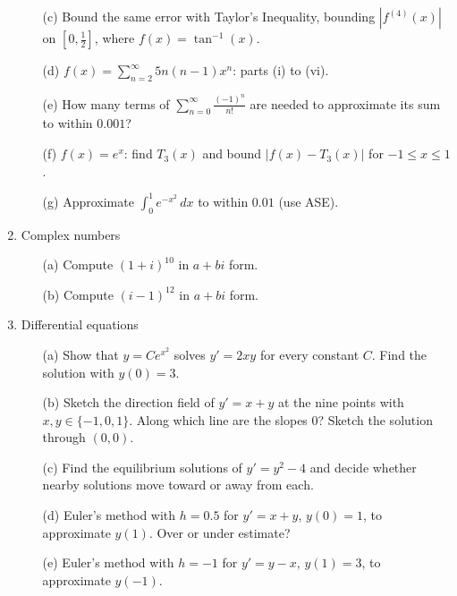 \documentclass[12pt]{article}
\begin{document}
\begin{enumerate}
\begin{enumerate}
\item[(c)] Bound the same error with Taylor's Inequality, bounding $|f^{(4)}(x)|$ on $[0,\frac12]$, where $f(x)=\tan^{-1}(x)$.

\item[(d)] $f(x)=\sum_{n=2}^\infty5n(n-1)x^n$: parts (i) to (vi).

\item[(e)] How many terms of $\sum_{n=0}^\infty\frac{(-1)^n}{n!}$ are needed to approximate its sum to within $0.001$?

\item[(f)] $f(x)=e^x$: find $T_3(x)$ and bound $|f(x)-T_3(x)|$ for $-1\le x\le1$.

\item[(g)] Approximate $\int_0^1e^{-x^2}\,dx$ to within $0.01$ (use ASE).

\end{enumerate}

\setcounter{enumi}{29}
\item Complex numbers
\begin{enumerate}
\item[(a)] Compute $(1+i)^{10}$ in $a+bi$ form.

\item[(b)] Compute $(i-1)^{12}$ in $a+bi$ form.

\end{enumerate}

\setcounter{enumi}{30}
\item Differential equations
\begin{enumerate}
\item[(a)] Show that $y=Ce^{x^2}$ solves $y'=2xy$ for every constant $C$. Find the solution with $y(0)=3$.

\item[(b)] Sketch the direction field of $y'=x+y$ at the nine points with $x,y\in\{-1,0,1\}$. Along which line are the slopes $0$? Sketch the solution through $(0,0)$.

\item[(c)] Find the equilibrium solutions of $y'=y^2-4$ and decide whether nearby solutions move toward or away from each.

\item[(d)] Euler's method with $h=0.5$ for $y'=x+y$, $y(0)=1$, to approximate $y(1)$. Over or under estimate?

\item[(e)] Euler's method with $h=-1$ for $y'=y-x$, $y(1)=3$, to approximate $y(-1)$.


\end{enumerate}
\end{enumerate}
\end{document}
